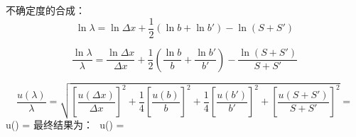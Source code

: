 \documentclass[11pt,a4paper,oneside]{article}
\begin{document}
不确定度的合成：
$$ \ln{\lambda} = \ln{{\Delta}x}+ \displaystyle\frac{1}{2}(\ln{b}+\ln{b'}) - \ln(S+S')$$

$$\displaystyle\frac{\ln{\lambda}}{\lambda} = \displaystyle\frac{\ln{\Delta}x}{{\Delta}x}+\displaystyle\frac{1}{2}(\displaystyle\frac{\ln{b}}{b}+\displaystyle\frac{\ln{b'}}{b'}) - \displaystyle\frac{\ln{(S+S')}}{S+S'} $$

$$\displaystyle\frac{u({\lambda})}{\lambda} = \sqrt{ [{\frac{u({\Delta}x)}{{\Delta}x}}]^2+\frac{1}{4}[{\frac{u(b)}{b}}]^2 +\frac{1}{4}[{\frac{u(b')}{b'}}]^2 + [\frac{u(S+S')}{S+S'}]^2   } = %

$$ u({\lambda}) = %
最终结果为：
$$ {\lambda}{\pm}{u({\lambda})} = %
\end{document}
